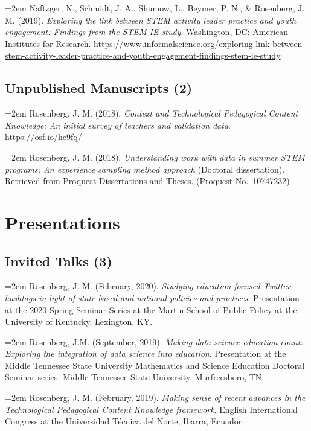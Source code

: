 \documentclass[
  14,
]{article}
\begin{document}
\hangindent=2em Naftzger, N., Schmidt, J. A., Shumow, L., Beymer, P. N.,
\& Rosenberg, J. M. (2019). \emph{Exploring the link between STEM
activity leader practice and youth engagement: Findings from the STEM IE
study}. Washington, DC: American Institutes for Research.
\url{https://www.informalscience.org/exploring-link-between-stem-activity-leader-practice-and-youth-engagement-findings-stem-ie-study}

\hypertarget{unpublished-manuscripts-2}{%
\subsection{Unpublished Manuscripts
(2)}\label{unpublished-manuscripts-2}}

\hangindent=2em Rosenberg, J. M. (2018). \emph{Context and Technological
Pedagogical Content Knowledge: An initial survey of teachers and
validation data}. \url{https://osf.io/hc9fq/}

\hangindent=2em Rosenberg, J. M. (2018). \emph{Understanding work with
data in summer STEM programs: An experience sampling method approach}
(Doctoral dissertation). Retrieved from Proquest Dissertations and
Theses. (Proquest No.~10747232)

\hypertarget{presentations}{%
\section{Presentations}\label{presentations}}

\hypertarget{invited-talks-3}{%
\subsection{Invited Talks (3)}\label{invited-talks-3}}

\hangindent=2em Rosenberg, J. M. (February, 2020). \emph{Studying
education-focused Twitter hashtags in light of state-based and national
policies and practices}. Presentation at the 2020 Spring Seminar Series
at the Martin School of Public Policy at the University of Kentucky,
Lexington, KY.

\hangindent=2em Rosenberg, J.M. (September, 2019). \emph{Making data
science education count: Exploring the integration of data science into
education}. Presentation at the Middle Tennessee State University
Mathematics and Science Education Doctoral Seminar series. Middle
Tennessee State University, Murfreesboro, TN.

\hangindent=2em Rosenberg, J. M. (February, 2019). \emph{Making sense of
recent advances in the Technological Pedagogical Content Knowledge
framework}. English International Congress at the Universidad Técnica
del Norte, Ibarra, Ecuador.
\end{document}
